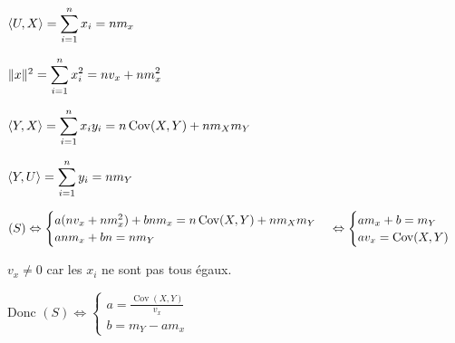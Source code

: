 \begin{exemple}
    $\langle U, X \rangle = \displaystyle \sum_{i = 1}^{n } x_i = n m_x$

    $\| x \|^2 = \displaystyle \sum_{i = 1}^{n } x_i^2 = nv_x + nm_x^2$

    $\langle Y, X \rangle = \displaystyle \sum_{i = 1}^n x_i y_i = n \operatorname{Cov}(X, Y) + nm_X m_Y$

    $\langle Y, U \rangle = \displaystyle \sum_{i = 1}^n y_i = n m_Y$

    $(S) \Leftrightarrow \displaystyle \begin{cases}
a (nv_x + nm_x^2) + b n m_x = n \operatorname{Cov}(X, Y) + nm_X m_Y \\
a n m_x + b n = n m_Y
    \end{cases} \Leftrightarrow \begin{cases}
        am_x + b = m_Y \\
        a v_x = \operatorname{Cov}(X, Y)
    \end{cases}$

    $v_x \neq 0$ car les $x_i$ ne sont pas tous égaux.

    Donc $(S) \Leftrightarrow \begin{cases}
        a = \frac{\operatorname{Cov}(X, Y)}{v_x} \\
        b = m_Y - a m_x
    \end{cases}$
\end{exemple}

